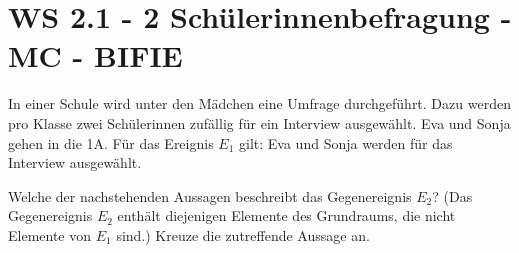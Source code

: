 \section{WS 2.1 - 2 Schülerinnenbefragung - MC - BIFIE}

\begin{beispiel}[WS 2.1]{1} %
In einer Schule wird unter den Mädchen eine Umfrage durchgeführt. Dazu werden pro Klasse
zwei Schülerinnen zufällig für ein Interview ausgewählt. Eva und Sonja gehen in die 1A.
Für das Ereignis $E_1$ gilt: Eva und Sonja werden für das Interview ausgewählt. \leer

Welche der nachstehenden Aussagen beschreibt das Gegenereignis $E_2$? (Das Gegenereignis
$E_2$ enthält diejenigen Elemente des Grundraums, die nicht Elemente von $E_1$ sind.)
Kreuze die zutreffende Aussage an.

\end{beispiel}
